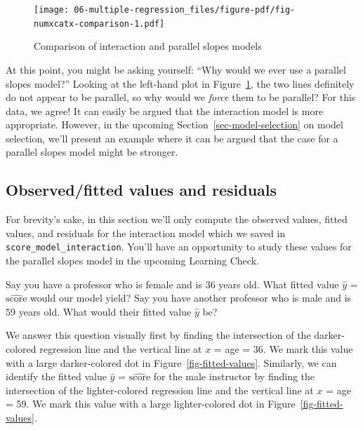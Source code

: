 \documentclass[
  letterpaper,
  DIV=11,
  numbers=noendperiod]{scrreprt}
\theoremstyle{definition}
\theoremstyle{remark}
\begin{document}
\begin{figure}

{\centering \texttt{[image: 06-multiple-regression\_files/figure-pdf/fig-numxcatx-comparison-1.pdf]}

}

\caption{\label{fig-numxcatx-comparison}Comparison of interaction and
parallel slopes models}

\end{figure}

At this point, you might be asking yourself: ``Why would we ever use a
parallel slopes model?'' Looking at the left-hand plot in
Figure~\ref{fig-numxcatx-comparison}, the two lines definitely do not
appear to be parallel, so why would we \emph{force} them to be parallel?
For this data, we agree! It can easily be argued that the interaction
model is more appropriate. However, in the upcoming
Section~\ref{sec-model-selection} on model selection, we'll present an
example where it can be argued that the case for a parallel slopes model
might be stronger.

\hypertarget{sec-model4points}{%
\subsection{Observed/fitted values and
residuals}\label{sec-model4points}}

For brevity's sake, in this section we'll only compute the observed
values, fitted values, and residuals for the interaction model which we
saved in \texttt{score\_model\_interaction}. You'll have an opportunity
to study these values for the parallel slopes model in the upcoming
Learning Check.

Say you have a professor who is female and is 36 years old. What fitted
value \(\widehat{y}\) = \(\widehat{\text{score}}\) would our model
yield? Say you have another professor who is male and is 59 years old.
What would their fitted value \(\widehat{y}\) be?

We answer this question visually first by finding the intersection of
the darker-colored regression line and the vertical line at \(x\) = age
= 36. We mark this value with a large darker-colored dot in
Figure~\ref{fig-fitted-values}. Similarly, we can identify the fitted
value \(\widehat{y}\) = \(\widehat{\text{score}}\) for the male
instructor by finding the intersection of the lighter-colored regression
line and the vertical line at \(x\) = age = 59. We mark this value with
a large lighter-colored dot in Figure~\ref{fig-fitted-values}.
\end{document}
